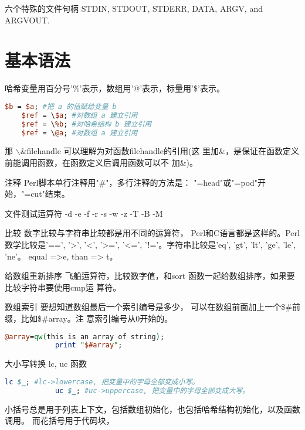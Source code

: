 \documentclass[a4paper,11pt]{book}
\begin{document}
\begin{description*}
    \item [六个特殊的文件句柄]
        	STDIN, STDOUT, STDERR, DATA, ARGV, and ARGVOUT.

\end{description*}

\section{基本语法}

哈希变量用百分号'\%'表示，数组用'@'表示，标量用'\$'表示。
\begin{lstlisting}[language=perl]
    $b = $a; #把 a 的值赋给变量 b
    $ref = \$a; #对数组 a 建立引用
    $ref = \%b; #对哈希结构 b 建立引用
    $ref = \@a; #对数组 a 建立引用
\end{lstlisting}
那 $\backslash$\&filehandle 可以理解为对函数filehandle的引用(这
里加\&，是保证在函数定义前能调用函数，在函数定义后调用函数可以不
加\&)。

\begin{description*}
    \item [注释] Perl脚本单行注释用"\#"，多行注释的方法是：
        "=head"或"=pod"开始，"=cut"结束。
    \item [文件测试运算符] -d -e -f -r -s -w -z -T -B -M 
    \item [比较] 数字比较与字符串比较都是用不同的运算符，
        Perl和C语言都是这样的。Perl 数学比较是'==', '>',
        '<', '>=', '<=', '!='。字符串比较是'eq', 'gt', 
        'lt', 'ge', 'le', 'ne'。  equal =>e, than => t。
    \item [给数组重新排序]飞船运算符，比较数字值，和sort
        函数一起给数组排序，如果要比较字符串要使用cmp运
        算符。

    \item [数组索引] 要想知道数组最后一个索引编号是多少，
        可以在数组前面加上一个\$\#前缀，比如\$\#array。注
        意索引编号从0开始的。
        \begin{lstlisting}[language=perl]
            @array=qw(this is an array of string);
            print "$#array";
        \end{lstlisting}
    \item [大小写转换] 
        lc, uc 函数
        \begin{lstlisting}[language=perl]
            lc $_; #lc->lowercase, 把变量中的字母全部变成小写。
            uc $_; #uc->uppercase, 把变量中的字母全部变成大写。
        \end{lstlisting}
\end{description*}
小括号总是用于列表上下文，包括数组初始化，也包括哈希结构初始化，以及函数调用。
而花括号用于代码块，
\end{document}
